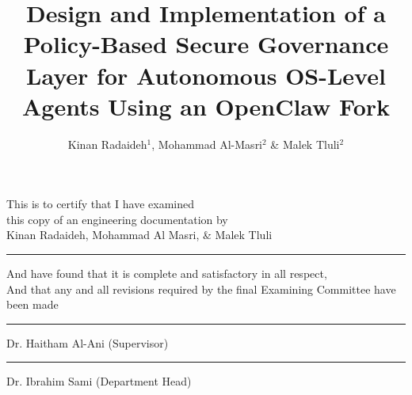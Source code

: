 \documentclass[a4paper]{report}
\begin{document}
\title{Design and Implementation of a Policy-Based Secure Governance Layer for Autonomous OS-Level Agents Using an OpenClaw Fork} %
\author{Kinan Radaideh$^1$, Mohammad Al-Masri$^2$ \&    Malek Tluli$^2$} %
\degree{\bsc}{\majorce}{\majorNISE}
\doctype{\SDP} %

\supervisoruni{\psut}



\beforepreface




\newpage
\begin{center}
    This is to certify that I have examined\\
    \vspace{0.2in}
    this copy of an engineering documentation by\\
    \vspace{0.2in}
    Kinan Radaideh, Mohammad Al Masri, \& Malek Tluli\\
    \vspace{0.1in}
    \hrule
    \vspace{1in}
    And have found that it is complete and satisfactory in all respect,\\
And that any and all revisions required by the final Examining Committee have been made\\
    \vspace{1in}
    \hrule
    \vspace{0.2in}
    Dr. Haitham Al-Ani (Supervisor)
     \vspace{1in}
    \hrule
    \vspace{0.2in}
    Dr. Ibrahim Sami (Department Head)
\end{center}
\end{document}
